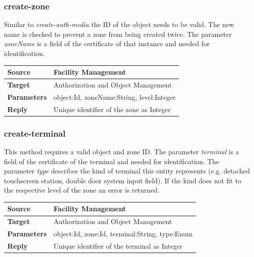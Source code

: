 \documentclass[12pt,a4paper,titlepage,oneside]{scrartcl}
\begin{document}
\subsubsection{create-zone}

Similar to \emph{create-auth-media} the ID of the object needs to be valid. The new name is checked to prevent a zone from being created twice. The parameter \emph{zoneName} is a field of the certificate of that instance and needed for identification.

\begin{table}[h]

    \centering

    \begin{tabular}{|l|p{12cm}|} \hline

    \textbf{Source}&Facility Management\\ \hline

    \textbf{Target}&Authorization and Object Management\\ \hline

    \textbf{Parameters}&object:Id, zoneName:String, level:Integer\\ \hline

    \textbf{Reply}&Unique identifier of the zone as Integer\\ \hline

    \end{tabular}

\end{table}

\subsubsection{create-terminal}

This method requires a valid object and zone ID. The parameter \emph{terminal} is a field of the certificate of the terminal and needed for identification. The parameter \emph{type} describes the kind of terminal this entity represents (e.g. detached touchscreen station, double door system input field). If the kind does not fit to the respective level of the zone an error is returned.

\begin{table}[h]

    \centering

    \begin{tabular}{|l|p{12cm}|} \hline

    \textbf{Source}&Facility Management\\ \hline

    \textbf{Target}&Authorization and Object Management\\ \hline

    \textbf{Parameters}&object:Id, zone:Id, terminal:String, type:Enum\\ \hline

    \textbf{Reply}&Unique identifier of the terminal as Integer\\ \hline

    \end{tabular}

\end{table}
\end{document}
